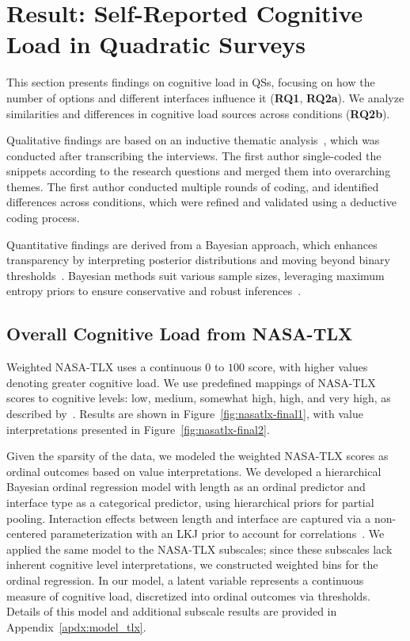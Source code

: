\section{Result: Self-Reported Cognitive Load in Quadratic Surveys}
\label{sec:cog}
This section presents findings on cognitive load in QSs, focusing on how the number of options and different interfaces influence it (\textbf{RQ1}, \textbf{RQ2a}). We analyze similarities and differences in cognitive load sources across conditions (\textbf{RQ2b}).

Qualitative findings are based on an inductive thematic analysis~\cite{olsonWaysKnowingHCI2014}, which was conducted after transcribing the interviews. The first author single-coded the snippets according to the research questions and merged them into overarching themes. The first author conducted multiple rounds of coding, and identified differences across conditions, which were refined and validated using a deductive coding process.

Quantitative findings are derived from a Bayesian approach, which enhances transparency by interpreting posterior distributions and moving beyond binary thresholds~\cite{kay2016researcher}. Bayesian methods suit various sample sizes, leveraging maximum entropy priors to ensure conservative and robust inferences~\cite{mcelreath2018statistical}.

\subsection{Overall Cognitive Load from NASA-TLX}
\label{sec:cog_overall}
Weighted NASA-TLX uses a continuous $0$ to $100$ score, with higher values denoting greater cognitive load. We use predefined mappings of NASA-TLX scores to cognitive levels: low, medium, somewhat high, high, and very high, as described by~\citet{hart1988development}. Results are shown in Figure~\ref{fig:nasatlx-final1}, with value interpretations presented in Figure~\ref{fig:nasatlx-final2}.

Given the sparsity of the data, we modeled the weighted NASA-TLX scores as ordinal outcomes based on value interpretations. We developed a hierarchical Bayesian ordinal regression model with length as an ordinal predictor and interface type as a categorical predictor, using hierarchical priors for partial pooling. Interaction effects between length and interface are captured via a non-centered parameterization with an LKJ prior to account for correlations~\cite{mcelreath2018statistical}. We applied the same model to the NASA-TLX subscales; since these subscales lack inherent cognitive level interpretations, we constructed weighted bins for the ordinal regression. In our model, a latent variable represents a continuous measure of cognitive load, discretized into ordinal outcomes via thresholds. Details of this model and additional subscale results are provided in Appendix~\ref{apdx:model_tlx}.

